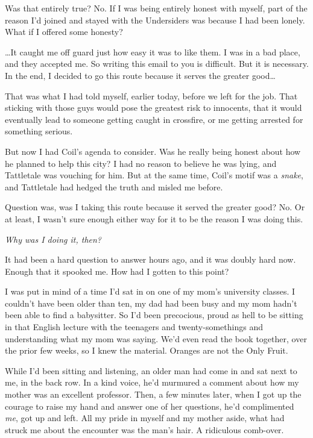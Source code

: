 Was that entirely true?  No.  If I was being entirely honest with myself, part of the reason I'd joined and stayed with the Undersiders was because I had been lonely.  What if I offered some honesty?



\ldots{}It caught me off guard just how easy it was to like them.  I was in a bad place, and they accepted me.  So writing this email to you is difficult.  But it is necessary.  In the end, I decided to go this route because it serves the greater good\ldots



That was what I had told myself, earlier today, before we left for the job.  That sticking with those guys would pose the greatest risk to innocents, that it would eventually lead to someone getting caught in crossfire, or me getting arrested for something serious.



But now I had Coil's agenda to consider.  Was he really being honest about how he planned to help this city?  I had no reason to believe he was lying, and Tattletale was vouching for him.  But at the same time, Coil's motif was a \emph{snake}, and Tattletale had hedged the truth and misled me before.



Question was, was I taking this route because it served the greater good?  No.  Or at least, I wasn't sure enough either way for it to be the reason I was doing this.



\emph{Why was I doing it, then?}



It had been a hard question to answer hours ago, and it was doubly hard now.  Enough that it spooked me.  How had I gotten to this point?



I was put in mind of a time I'd sat in on one of my mom's university classes.  I couldn't have been older than ten, my dad had been busy and my mom hadn't been able to find a babysitter.  So I'd been precocious, proud as hell to be sitting in that English lecture with the teenagers and twenty-somethings and understanding what my mom was saying.  We'd even read the book together, over the prior few weeks, so I knew the material.  Oranges are not the Only Fruit.



While I'd been sitting and listening, an older man had come in and sat next to me, in the back row.  In a kind voice, he'd murmured a comment about how my mother was an excellent professor.  Then, a few minutes later, when I got up the courage to raise my hand and answer one of her questions, he'd complimented \emph{me}, got up and left.  All my pride in myself and my mother aside, what had struck me about the encounter was the man's hair.  A ridiculous comb-over.



